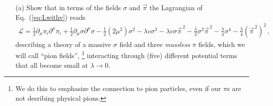 \documentclass[11pt]{latex/exercise}
\begin{document}
\begin{itemize}
    \item[(a)] Show that in terms of the fields $\sigma$ and $\vec \pi$ the Lagrangian of Eq.~(\ref{eq:Lwithv}) reads
          \begin{eqnarray}
              \mathcal{L} =
              \frac12 \partial_{\mu} \pi_i \partial^{\mu} \pi_i
              +\frac12 \partial_{\mu} \sigma \partial^{\mu} \sigma
              -\frac12 (2\mu^2)\sigma^2
              -\lambda v\sigma^3 -\lambda v\sigma \vec{\pi}^{\,2}
              -\frac{\lambda}{2} \sigma^2 \vec{\pi}^{\,2}
              -\frac{\lambda}{4} \sigma^4
              -\frac{\lambda}{4} (\vec{\pi}^{\,2})^2
              \,,
          \end{eqnarray}
          describing a theory of a massive $\sigma$ field and three \emph{massless} $\pi$ fields, which we will call ``pion fields'',%
          \footnote{We do this to emphasize the connection to pion particles, even if our $\pi$s are not desribing physical pions.}
          interacting through (five) different potential terms that all become small at $\lambda\rightarrow 0$.


\end{itemize}
\end{document}

